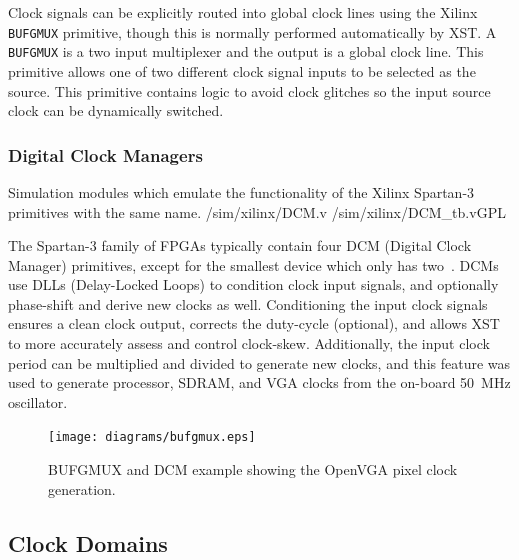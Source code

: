 Clock signals can be explicitly routed into global clock lines using the Xilinx
\texttt{BUFGMUX} primitive, though this is normally performed automatically by
XST. A \texttt{BUFGMUX} is a two input multiplexer and the output is a global
clock line. This primitive allows one of two different clock signal inputs to be
selected as the source. This primitive contains logic to avoid clock glitches so
the input source clock can be dynamically switched.


\subsubsection{Digital Clock Managers}
\label{CLOCK_DCM}

{Simulation modules which emulate the functionality of the Xilinx Spartan-3
primitives with the same name.} {/sim/xilinx/DCM.v} {/sim/xilinx/DCM\_tb.v}{GPL}

The Spartan-3 family of FPGAs typically contain four DCM (Digital Clock Manager)
primitives, except for the smallest device which only has
two~\cite{Xilinx_SP3_DS}. DCMs use DLLs (Delay-Locked Loops) to condition clock
input signals, and optionally phase-shift and derive new clocks as well.
Conditioning the input clock signals ensures a clean clock output, corrects the
duty-cycle (optional), and allows XST to more accurately assess and control
clock-skew. Additionally, the input clock period can be multiplied and divided to
generate new clocks, and this feature was used to generate processor, SDRAM, and
VGA clocks from the on-board 50~MHz oscillator.

\begin{figure}[h!]
\begin{center}
\texttt{[image: diagrams/bufgmux.eps]}
\caption[OpenVGA pixel clock generation]{BUFGMUX and DCM example showing the
OpenVGA pixel clock generation.}
\label{CLOCK_BUFGMUX}
\end{center}
\end{figure}


\subsection{Clock Domains}

